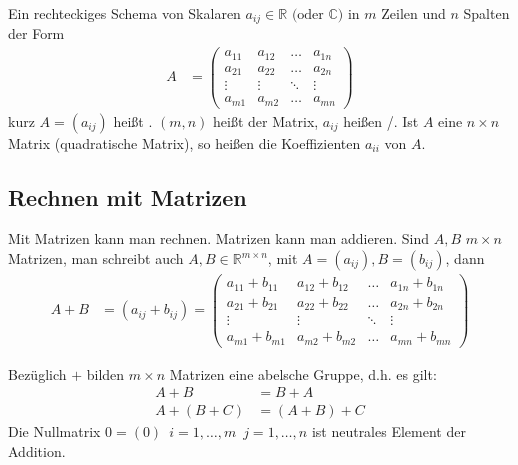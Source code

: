 

Ein rechteckiges Schema von Skalaren $a_{ij} \in \mathbb{R}\text{ (oder }\mathbb{C}\text{)}$ in $m$ Zeilen und $n$ Spalten der Form
\begin{align*}
    A &=
    \begin{pmatrix}
        a_{11} & a_{12} & \dots & a_{1n} \\
        a_{21} & a_{22} & \dots & a_{2n} \\
        \vdots & \vdots & \ddots & \vdots \\
        a_{m1} & a_{m2} & \dots & a_{mn}
    \end{pmatrix}
\end{align*}
kurz $A = (a_{ij})$ heißt . $(m, n)$ heißt  der Matrix, $a_{ij}$ heißen /. Ist $A$ eine $n \times n$ Matrix (quadratische Matrix), so heißen die Koeffizienten $a_{ii}$  von $A$.

\subsection{Rechnen mit Matrizen}
Mit Matrizen kann man rechnen. Matrizen kann man addieren. Sind $A, B$ $m \times n$ Matrizen, man schreibt auch $A, B \in \mathbb{R}^{m \times n}$, mit $A = (a_{ij}), B = (b_{ij})$, dann
\begin{align*}
    A + B &= (a_{ij} + b_{ij}) =
    \begin{pmatrix}
        a_{11} + b_{11} & a_{12} + b_{12} & \dots & a_{1n} + b_{1n} \\
        a_{21} + b_{21} & a_{22} + b_{22} & \dots & a_{2n} + b_{2n} \\
        \vdots & \vdots & \ddots & \vdots \\
        a_{m1} + b_{m1} & a_{m2} + b_{m2} & \dots & a_{mn} + b_{mn}
    \end{pmatrix}
\end{align*}

Bezüglich \glqq{}$+$\grqq{} bilden $m \times n$ Matrizen eine abelsche Gruppe, d.h. es gilt:
\begin{align*}
    A + B &= B + A \\
    A + (B + C) &= (A + B) + C
\end{align*}
Die Nullmatrix $0 = (0)\enspace i = 1,\dots,m\enspace j = 1,\dots,n$ ist neutrales Element der Addition.

